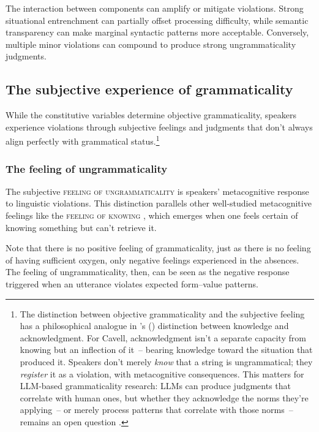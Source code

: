 \documentclass[12pt,letterpaper]{article}
\newcommand{\posscite}[1]{\citeauthor{#1}'s (\citeyear{#1})}
\begin{document}
The interaction between components can amplify or mitigate violations. Strong situational entrenchment can partially offset processing difficulty, while semantic transparency can make marginal syntactic patterns more acceptable. Conversely, multiple minor violations can compound to produce strong ungrammaticality judgments.

\subsection{The subjective experience of grammaticality}\label{sec:subjective}

While the constitutive variables determine objective grammaticality, speakers experience violations through subjective feelings and judgments that don't always align perfectly with grammatical status.\footnote{The distinction between objective grammaticality and the subjective feeling has a philosophical analogue in \posscite{Cavell1969KnowingAcknowledging} distinction between knowledge and acknowledgment. For Cavell, acknowledgment isn't a separate capacity from knowing but an inflection of it~-- bearing knowledge toward the situation that produced it. Speakers don't merely \emph{know} that a string is ungrammatical; they \emph{register} it as a violation, with metacognitive consequences. This matters for LLM-based grammaticality research: LLMs can produce judgments that correlate with human ones, but whether they acknowledge the norms they're applying~-- or merely process patterns that correlate with those norms~-- remains an open question \autocite{Techio2026ClaimTrainingData}.}

\subsubsection{The feeling of ungrammaticality}\label{sec:feeling}

The subjective \textsc{feeling of ungrammaticality} is speakers' metacognitive response to linguistic violations. This distinction parallels other well-studied metacognitive feelings like the \textsc{feeling of knowing} \autocite[FOK;][]{hart1965}, which emerges when one feels certain of knowing something but can't retrieve it.

Note that there is no positive feeling of grammaticality, just as there is no feeling of having sufficient oxygen, only negative feelings experienced in the absences. The feeling of ungrammaticality, then, can be seen as the negative response triggered when an utterance violates expected form--value patterns.
\end{document}
